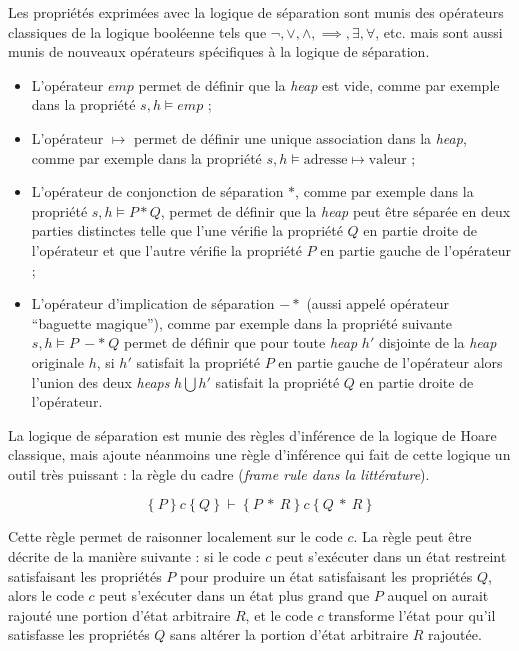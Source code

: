 		Les propriétés exprimées avec la logique de séparation sont munis des opérateurs classiques de la logique booléenne tels que $\neg, \lor, \land, \implies, \exists, \forall$, etc. mais sont aussi munis de nouveaux opérateurs spécifiques à la logique de séparation. 
		\begin{itemize}
			\item L'opérateur $emp$ permet de définir que la \emph{heap} est vide, comme par exemple dans la propriété $s, h \vDash emp$ ;
			\item L'opérateur $\mapsto$ permet de définir une unique association dans la \emph{heap}, comme par exemple dans la propriété $s, h \vDash \text{adresse} \mapsto \text{valeur}$ ;
			\item L'opérateur de conjonction de séparation $*$, comme par exemple dans la propriété $s, h \vDash P * Q$, permet de définir que la \emph{heap} peut être séparée en deux parties distinctes telle que l'une vérifie la propriété $Q$ en partie droite de l'opérateur et que l'autre vérifie la propriété $P$ en partie gauche de l'opérateur ;
			\item L'opérateur d'implication de séparation $-*$ (aussi appelé opérateur ``baguette magique''), comme par exemple dans la propriété suivante $s, h \vDash P~{-}{*}~Q$ permet de définir que pour toute \emph{heap} $h'$ disjointe de la \emph{heap} originale $h$, si $h'$ satisfait la propriété $P$ en partie gauche de l'opérateur alors l'union des deux \emph{heaps} $h \bigcup h'$ satisfait la propriété $Q$ en partie droite de l'opérateur.
		\end{itemize}

		La logique de séparation est munie des règles d'inférence de la logique de Hoare classique, mais ajoute néanmoins une règle d'inférence qui fait de cette logique un outil très puissant : la règle du cadre (\emph{frame rule dans la littérature}).

		$$ \{~P~\}~c~\{~Q~\}~\vdash~\{~P~*~R~\}~c~\{~Q~*~R~\}$$

		Cette règle permet de raisonner localement sur le code $c$. La règle peut être décrite de la manière suivante : si le code $c$ peut s'exécuter dans un état restreint satisfaisant les propriétés $P$ pour produire un état satisfaisant les propriétés $Q$, alors le code $c$ peut s'exécuter dans un état plus grand que $P$ auquel on aurait rajouté une portion d'état arbitraire $R$, et le code $c$ transforme l'état pour qu'il satisfasse les propriétés $Q$ sans altérer la portion d'état arbitraire $R$ rajoutée.

